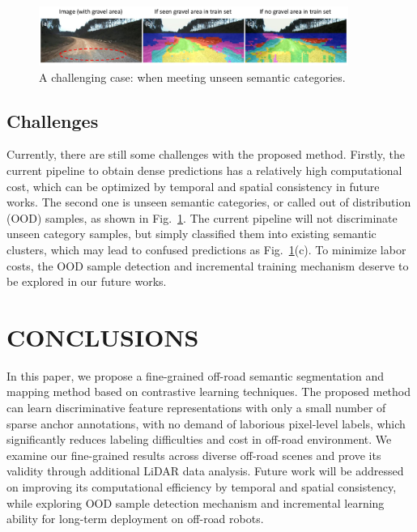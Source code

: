 \documentclass[letterpaper, 10 pt, conference]{ieeeconf}  %
\begin{document}
\begin{figure}[]
	\centering
	\includegraphics[width=0.9\textwidth]{challenges.pdf}
	\caption{A challenging case: when meeting unseen semantic categories.}
	\label{fig:challenges}
	\vspace{-4mm}
\end{figure}

\subsection{Challenges}
Currently, there are still some challenges with the proposed method. Firstly, the current pipeline to obtain dense predictions has a relatively high computational cost, which can be optimized by temporal and spatial consistency in future works.
The second one is unseen semantic categories, or called out of distribution (OOD) samples, as shown in Fig.~\ref{fig:challenges}. The current pipeline will not discriminate unseen category samples, but simply classified them into existing semantic clusters, which may lead to confused predictions as Fig.~\ref{fig:challenges}(c). To minimize labor costs, the OOD sample detection and incremental training mechanism deserve to be explored in our future works.



\section{CONCLUSIONS}	\label{conclusions}
In this paper, we propose a fine-grained off-road semantic segmentation and mapping method based on contrastive learning techniques. 
The proposed method can learn discriminative feature representations with only a small number of sparse anchor annotations, with no demand of laborious pixel-level labels, which significantly reduces labeling difficulties and cost in off-road environment.
We examine our fine-grained results across diverse off-road scenes and prove its validity through additional LiDAR data analysis.
Future work will be addressed on improving its computational efficiency by temporal and spatial consistency, while exploring OOD sample detection mechanism and incremental learning ability for long-term deployment on off-road robots.
\end{document}
